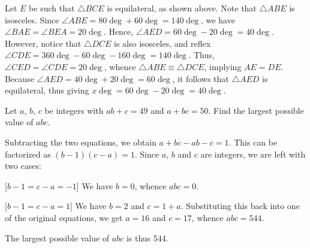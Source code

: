 \begin{solution*}
    Let $E$ be such that $\triangle BCE$ is equilateral, as shown above. Note that $\triangle ABE$ is isosceles. Since $\angle ABE = 80\deg + 60 \deg = 140 \deg$, we have $\angle BAE = \angle BEA = 20\deg$. Hence, $\angle AED = 60\deg - 20\deg = 40\deg$. However, notice that $\triangle DCE$ is also isosceles, and reflex $\angle CDE = 360\deg - 60\deg - 160\deg = 140\deg$. Thus, $\angle CED = \angle CDE = 20 \deg$, whence $\triangle ABE \equiv \triangle DCE$, implying $AE = DE$. Because $\angle AED = 40\deg + 20\deg = 60\deg$, it follows that $\triangle AED$ is equilateral, thus giving $x\deg = 60\deg - 20\deg = 40\deg$. 
\end{solution*}

\begin{question}[544]\label{Q::2022-O-1-11}
    Let $a$, $b$, $c$ be integers with $ab + c = 49$ and $a + bc = 50$. Find the largest possible value of $abc$.
\end{question}
\begin{solution*}
    Subtracting the two equations, we obtain $a + bc - ab - c = 1$. This can be factorized as $(b-1)(c-a) = 1$. Since $a$, $b$ and $c$ are integers, we are left with two cases:

    [$b-1 = c-a = -1$] We have $b = 0$, whence $abc = 0$.

    [$b-1 = c-a = 1$] We have $b = 2$ and $c = 1 + a$. Substituting this back into one of the original equations, we get $a = 16$ and $c = 17$, whence $abc = 544$.

    The largest possible value of $abc$ is thus 544.
\end{solution*}

